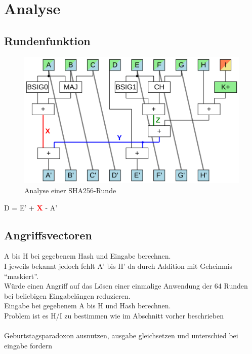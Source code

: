 \section{Analyse}


\subsection{Rundenfunktion}

\begin{figure}[ht]
  \centering
  \includegraphics[scale=0.4]{images/sha256coreA}
  \caption{Analyse einer SHA256-Runde}
  \label{fig:sha256coreA}
\end{figure}

D = E' + \textcolor{red}{\textbf{X}} - A'

\subsection{Angriffsvectoren}

A bis H bei gegebenem Hash und Eingabe berechnen.\\
I jeweils bekannt jedoch fehlt A' bis H' da durch Addition mit Geheimnis "`maskiert"'.\\
Würde einen Angriff auf das Lösen einer einmalige Anwendung der 64 Runden bei beliebigen Eingabelängen reduzieren.
~\\
Eingabe bei gegebenem A bis H und Hash berechnen.\\
Problem ist es H/I zu bestimmen wie im Abschnitt vorher beschrieben\\
~\\
Geburtstagsparadoxon ausnutzen, ausgabe gleichsetzen und unterschied bei eingabe fordern
